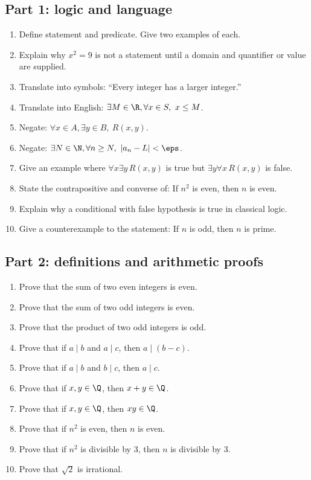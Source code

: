 \subsection{Part 1: logic and language}

\begin{enumerate}
\item Define statement and predicate. Give two examples of each.
\item Explain why $x^2=9$ is not a statement until a domain and quantifier or value are supplied.
\item Translate into symbols: ``Every integer has a larger integer.''
\item Translate into English: $\exists M\in\R,\forall x\in S,\ x\leq M$.
\item Negate: $\forall x\in A,\exists y\in B,\ R(x,y)$.
\item Negate: $\exists N\in\N,\forall n\geq N,\ |a_n-L|<\eps$.
\item Give an example where $\forall x\exists y\,R(x,y)$ is true but $\exists y\forall x\,R(x,y)$ is false.
\item State the contrapositive and converse of: If $n^2$ is even, then $n$ is even.
\item Explain why a conditional with false hypothesis is true in classical logic.
\item Give a counterexample to the statement: If $n$ is odd, then $n$ is prime.
\end{enumerate}

\subsection{Part 2: definitions and arithmetic proofs}

\begin{enumerate}
\item Prove that the sum of two even integers is even.
\item Prove that the sum of two odd integers is even.
\item Prove that the product of two odd integers is odd.
\item Prove that if $a\mid b$ and $a\mid c$, then $a\mid(b-c)$.
\item Prove that if $a\mid b$ and $b\mid c$, then $a\mid c$.
\item Prove that if $x,y\in\Q$, then $x+y\in\Q$.
\item Prove that if $x,y\in\Q$, then $xy\in\Q$.
\item Prove that if $n^2$ is even, then $n$ is even.
\item Prove that if $n^2$ is divisible by $3$, then $n$ is divisible by $3$.
\item Prove that $\sqrt2$ is irrational.
\end{enumerate}

